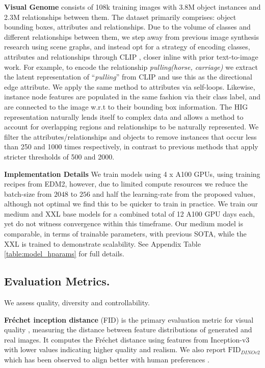 \textbf{Visual Genome} consists of 108k training images with 3.8M object instances and 2.3M relationships between them. The dataset primarily comprises: object bounding boxes, attributes and relationships. Due to the volume of classes and different relationships between them, we step away from previous image synthesis research using scene graphs, and instead opt for a strategy of encoding classes, attributes and relationships through CLIP \cite{radford2021learningtransferablevisualmodels}, closer inline with prior text-to-image work. For example, to encode the relationship \textit{pulling(horse, carriage)} we extract the latent representation of ``\textit{pulling}'' from CLIP and use this as the directional edge attribute. We apply the same method to attributes via self-loops. Likewise, instance node features are populated in the same fashion via their class label, and are connected to the image w.r.t to their bounding box information. The HIG representation naturally lends itself to complex data and allows a method to account for overlapping regions and relationships to be naturally represented. We filter the attributes/relationships and objects to remove instances that occur less than 250 and 1000 times respectively, in contrast to previous methods that apply stricter thresholds of 500 and 2000.

\textbf{Implementation Details} 
We train models using 4 x A100 GPUs, using training recipes from EDM2, however, due to limited compute resources we reduce the batch-size from $2048$ to $256$ and half the learning-rate from the proposed values, although not optimal we find this to be quicker to train in practice. We train our medium and XXL base models for a combined total of 12 A100 GPU days each, yet do not witness convergence within this timeframe. Our medium model is comparable, in terms of trainable parameters, with previous SOTA, while the XXL is trained to demonstrate scalability. See Appendix Table \ref{table:model_hparams} for full details.

\subsection{Evaluation Metrics.}
We assess quality, diversity and controllability.

\textbf{Fréchet inception distance} (FID) is the primary evaluation metric for visual quality \cite{heusel2018ganstrainedtimescaleupdate}, measuring the distance between feature distributions of generated and real images. It computes the Fréchet distance using features from Inception-v3 \cite{szegedy2015rethinkinginceptionarchitecturecomputer}  with lower values indicating higher quality and realism. We also report $\text{FID}_{\textit{DINOv2}}$ \cite{oquab_dinov2_2024} which has been observed to align better with human preferences \cite{stein_exposing_2023}.

